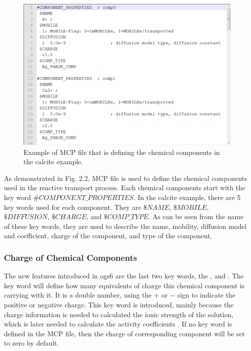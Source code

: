 \begin{figure}
\includegraphics[width=\textwidth]{RT/figs/RT_fig_mcp_file}
\caption{Example of MCP file that is defining the chemical components in the calcite example.}
\label{fig:RT_mcp_file}
\end{figure}

As demonstrated in Fig. 2.2, MCP file is used to define the chemical components used in the reactive transport process. Each chemical components start with the key word $\#COMPONENT\_PROPERTIES$. In the calcite example, there are 5 key words used for each component. They are $\$NAME$, $\$MOBILE$, $\$DIFFUSION$, $\$CHARGE$, and $\$COMP\_TYPE$. As can be seen from the name of these key words, they are used to describe the name, mobility, diffusion model and coefficient, charge of the component, and type of the component. 

\subsubsection{Charge of Chemical Components}

The new features introduced in ogs6 are the last two key words, the , and . The  key word will define how many equivalents of charge this chemical component is carrying with it. It is a double number, using the $+$ or $-$ sign to indicate the positive or negative charge. This key word is introduced, mainly because the charge information is needed to calculated the ionic strength of the solution, which is later needed to calculate the activity coefficients . If no  key word is defined in the MCP file, then the charge of corresponding component will be set to zero by default. 

